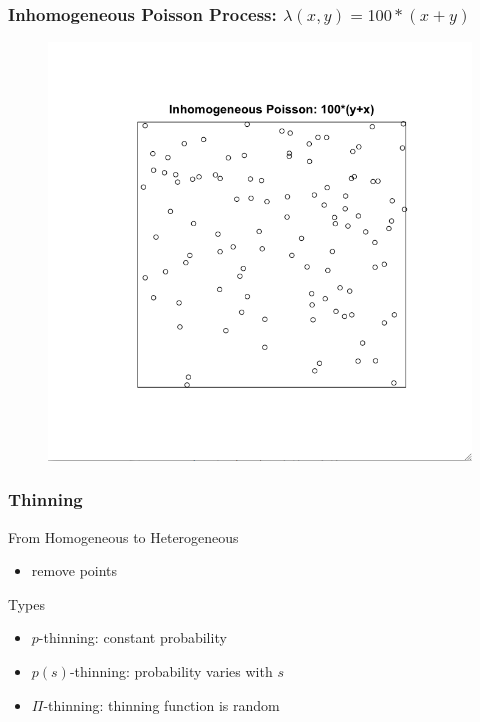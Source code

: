 \documentclass[nototal,handout]{beamer}
\begin{document}
\begin{frame}
  \frametitle{Inhomogeneous Poisson Process: $\lambda(x,y)=100*(x+y)$}
 \begin{figure}[ht]
  \centering
  \includegraphics[scale=0.30]{ihpxy.png}
  \end{figure}
 \end{frame} 

\begin{frame}
    \frametitle{Thinning}
    \begin{block}{From Homogeneous to Heterogeneous}
      \begin{itemize}
	\item remove points
      \end{itemize}
    \end{block}

    \begin{block}{Types}
      \begin{itemize}
	\item $p$-thinning: constant probability
	\item $p(s)$-thinning: probability varies with $s$
	\item $\Pi$-thinning: thinning function is random
      \end{itemize}
    \end{block}
\end{frame}
\end{document}

